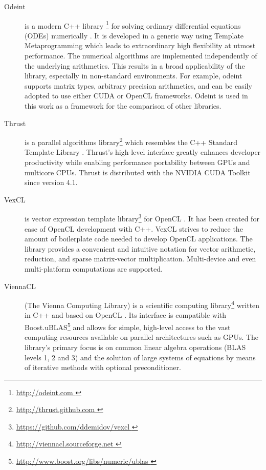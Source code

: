 \documentclass[final]{siamltex}
\begin{document}
\begin{description}
    \item[Odeint] is a modern C++ library \footnote{ \href{ http://odeint.com }{
	http://odeint.com } } for solving ordinary differential
	equations (ODEs) numerically \cite{OdeintRef1, OdeintRef2}. It is developed in a generic
	way using Template Metaprogramming which leads to extraordinary high
	flexibility at utmost performance. The numerical algorithms are
	implemented independently of the underlying arithmetics. This results
	in a broad applicability of the library, especially in non-standard
	environments.  For example, odeint supports matrix types, arbitrary
	precision arithmetics, and can be easily adopted to use either CUDA or
	OpenCL frameworks.  Odeint is used in this work as a framework for the
	comparison of other libraries.
    \item[Thrust] is a parallel algorithms library\footnote{ \href{
	http://thrust.github.com }{ http://thrust.github.com }} which resembles
	the C++ Standard Template Library \cite{ThrustRef}.  Thrust's
	high-level interface greatly enhances developer productivity while
	enabling performance portability between GPUs and multicore CPUs.
	Thrust is distributed with the NVIDIA CUDA Toolkit since version 4.1.
    \item[VexCL] is vector expression template
	library\footnote{ \href{ https://github.com/ddemidov/vexcl }{
	https://github.com/ddemidov/vexcl }} for OpenCL \cite{VexCLRef}. It has
	been created for ease of OpenCL development with C++.  VexCL strives to
	reduce the amount of boilerplate code needed to develop OpenCL
	applications. The library provides a convenient and intuitive notation
	for vector arithmetic, reduction, and sparse matrix-vector
	multiplication.  Multi-device and even multi-platform computations are
	supported.
    \item[ViennaCL] (The Vienna Computing Library) is a scientific computing
	library\footnote{ \href{ http://viennacl.sourceforge.net }{
	http://viennacl.sourceforge.net }} written in C++ and based on OpenCL
	\cite{ViennaCLRef}. Its interface is compatible with 
	Boost.uBLAS\footnote{ \href{ http://www.boost.org/libs/numeric/ublas }
	{ http://www.boost.org/libs/numeric/ublas } }
	and allows for simple, high-level access to the vast
	computing resources available on parallel architectures such as GPUs.
	The library's primary focus is on common linear algebra operations (BLAS
	levels 1, 2 and 3) and the solution of large systems of equations by
	means of iterative methods with optional preconditioner.
\end{description}
\end{document}
